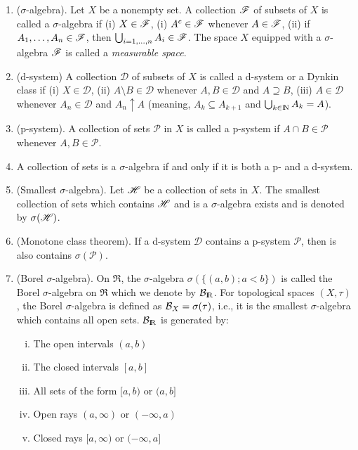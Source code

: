 \documentclass[a4paper,10pt]{scrbook}
\begin{document}
\begin{enumerate}
 \item ($\sigma$-algebra). Let $X$ be a nonempty set. A collection $\mathscr{F}$ of subsets of $X$
       is called a $\sigma$-algebra if (i) $X \in \mathscr{F}$, (i) $A^c\in\mathscr{F}$ whenever $A\in\mathscr{F}$,
       (ii) if $A_1,\ldots, A_n\in\mathscr{F}$, then $\bigcup_{i=1,\ldots,n}A_i\in\mathscr{F}$. The space $X$
       equipped with a $\sigma$-algebra $\mathscr{F}$ is called a \textit{measurable space}.
       
 \item (d-system) A collection $\mathcal{D}$ of subsets of $X$ is called a d-system or a Dynkin class if 
       (i) $X\in\mathcal{D}$,
       (ii) $A\setminus B\in\mathcal{D}$ whenever $A,B\in\mathcal{D}$ and $A\supseteq B$,
       (iii) $A\in\mathcal{D}$ whenever $A_n\in \mathcal{D}$ and $A_n \uparrow A$ (meaning, 
       $A_{k}\subseteq A_{k+1}$ and $\bigcup_{k\in\N}A_k=A$).
       
 \item (p-system). A collection of sets $\mathcal{P}$ in $X$ is called a p-system
       if $A\cap B\in \mathcal{P}$ whenever $A,B\in\mathcal{P}$.
       
 \item A collection of sets is a $\sigma$-algebra if and only if it is both a p- and a d-system.
 
 \item (Smallest $\sigma$-algebra). Let $\mathscr{H}$ be a collection of sets in $X$. The smallest collection of sets
       which contains $\mathscr{H}$ and is a $\sigma$-algebra exists and is denoted by $\sigma(\mathscr{H})$.
 
 \item (Monotone class theorem). If a d-system $\mathcal{D}$ contains a p-system $\mathcal{P}$, then is also contains $\sigma(\mathcal{P})$.
 
 \item \label{mps1311949}
       (Borel $\sigma$-algebra). On $\Re$, the $\sigma$-algebra $\sigma(\{(a,b); a<b\})$ is called the Borel $\sigma$-algebra on $\Re$
       which we denote by $\B_\Re$. For topological spaces $(X,\tau)$, the Borel $\sigma$-algebra is
       defined as $\mathcal{B}_X = \sigma(\tau)$, i.e., it is the smallest $\sigma$-algebra which contains
       all open sets. $\B_\Re$ is generated by:
       \begin{enumerate}[i.]
        \item The open intervals $(a,b)$
        \item The closed intervals $[a,b]$
        \item All sets of the form $[a,b)$ or $(a,b]$
        \item Open rays $(a,\infty)$ or $(-\infty,a)$
        \item Closed rays $[a,\infty)$ or $(-\infty,a]$
       \end{enumerate}            


\end{enumerate}
\end{document}
